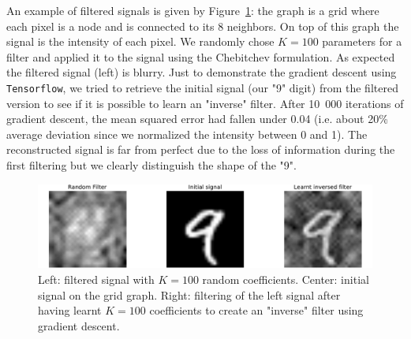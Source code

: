 An example of filtered signals is given by Figure~\ref{fig:inversed_learnt}: the graph is a grid where each pixel is a node and is connected to its 8 neighbors. On top of this graph the signal is the intensity of each pixel. We randomly chose $K=100$ parameters for a filter and applied it to the signal using the Chebitchev formulation. As expected the filtered signal (left) is blurry. Just to demonstrate the gradient descent using \texttt{Tensorflow}, we tried to retrieve the initial signal (our "9" digit) from the filtered version to see if it is possible to learn an "inverse" filter. After 10~000 iterations of gradient descent, the mean squared error had fallen under 0.04 (i.e. about 20\% average deviation since we normalized the intensity between 0 and 1). The reconstructed signal is far from perfect due to the loss of information during the first filtering but we clearly distinguish the shape of the "9".

\begin{figure}
    \centering
    \includegraphics[width=\textwidth]{img/inversed_learnt.pdf}
    \caption{Left: filtered signal with $K=100$ random coefficients. Center: initial signal on the grid graph. Right: filtering of the left signal after having learnt $K=100$ coefficients to create an "inverse" filter using gradient descent.}
    \label{fig:inversed_learnt}
\end{figure}